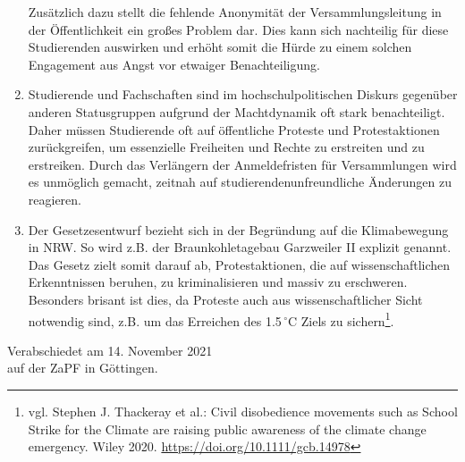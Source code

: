 \documentclass[DIV=calc]{scrartcl}
\begin{document}
\begin{enumerate}
Zusätzlich dazu stellt die fehlende Anonymität der Versammlungsleitung in der Öffentlichkeit ein großes Problem dar. Dies kann sich nachteilig für diese Studierenden auswirken und erhöht somit die Hürde zu einem solchen Engagement aus Angst vor etwaiger Benachteiligung.
\item Studierende und Fachschaften sind im hochschulpolitischen Diskurs gegenüber anderen Statusgruppen aufgrund der Machtdynamik oft stark benachteiligt. Daher müssen Studierende oft auf öffentliche Proteste und Protestaktionen zurückgreifen, um essenzielle Freiheiten und Rechte zu erstreiten und zu erstreiken. Durch das Verlängern der Anmeldefristen für Versammlungen wird es unmöglich gemacht, zeitnah auf studierendenunfreundliche Änderungen zu reagieren.
\item Der Gesetzesentwurf bezieht sich in der Begründung auf die Klimabewegung in NRW. So wird z.B. der Braunkohletagebau Garzweiler II explizit genannt. Das Gesetz zielt somit darauf ab, Protestaktionen, die auf wissenschaftlichen Erkenntnissen beruhen, zu kriminalisieren und massiv zu erschweren. Besonders brisant ist dies, da Proteste auch aus wissenschaftlicher Sicht notwendig sind, z.B. um das Erreichen des 1.5$\,^\circ$C Ziels zu sichern\footnote{vgl. Stephen J. Thackeray et al.: Civil disobedience movements such as School Strike for the Climate are raising public awareness of the climate change emergency. Wiley 2020. \url{https://doi.org/10.1111/gcb.14978}}.
\end{enumerate}


\vfill
\begin{flushright}
	Verabschiedet am 14. November 2021 \\
	auf der ZaPF in Göttingen.
\end{flushright}
\end{document}
